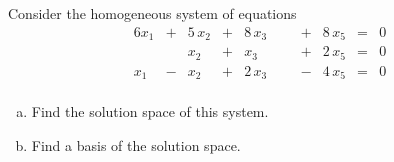 
\begin{exerciseStatement}


Consider the homogeneous system of equations 
\begin{alignat*}{6} x_{1} &+& 5 \, x_{2} &+& 8 \, x_{3} & &  &+& 8 \, x_{5} &=& 0 \\ & & x_{2} &+& x_{3} & &  &+& 2 \, x_{5} &=& 0 \\x_{1} &-& x_{2} &+& 2 \, x_{3} & &  &-& 4 \, x_{5} &=& 0 \\ \end{alignat*}
            


\begin{enumerate}[(a)]
\item  Find the solution space of this system.
\item  Find a basis of the solution space.
\end{enumerate}
    
\end{exerciseStatement}
    
